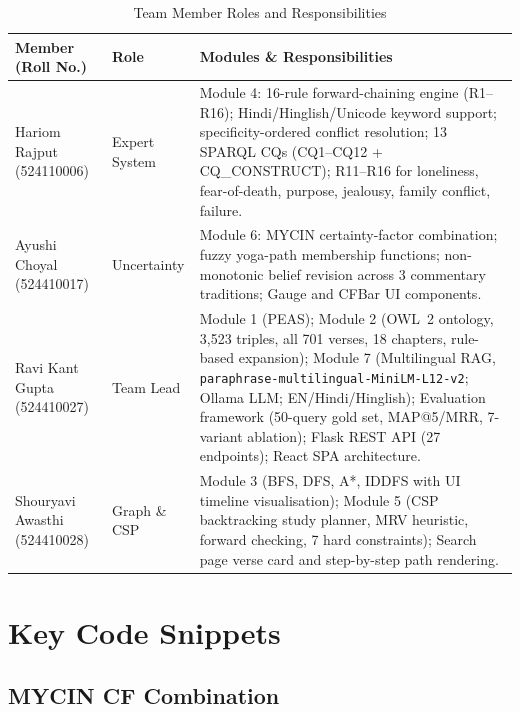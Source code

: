 \documentclass[conference]{IEEEtran}
\begin{document}
\begin{table}[!t]
\caption{Team Member Roles and Responsibilities}
\label{tab:tasks}
\centering
\begin{tabular}{p{3.0cm}p{2.0cm}p{10.5cm}}
\toprule
\textbf{Member (Roll No.)} & \textbf{Role} & \textbf{Modules \& Responsibilities} \\
\midrule
Hariom Rajput \newline (524110006)
  & Expert System
  & Module 4: 16-rule forward-chaining engine (R1--R16); Hindi/Hinglish/Unicode keyword support; specificity-ordered conflict resolution; 13 SPARQL CQs (CQ1--CQ12 + CQ\_CONSTRUCT); R11--R16 for loneliness, fear-of-death, purpose, jealousy, family conflict, failure. \\
\midrule
Ayushi Choyal \newline (524410017)
  & Uncertainty
  & Module 6: MYCIN certainty-factor combination; fuzzy yoga-path membership functions; non-monotonic belief revision across 3 commentary traditions; Gauge and CFBar UI components. \\
\midrule
Ravi Kant Gupta \newline (524410027)
  & Team Lead
  & Module 1 (PEAS); Module 2 (OWL~2 ontology, 3,523 triples, all 701 verses, 18 chapters, rule-based expansion); Module 7 (Multilingual RAG, \texttt{paraphrase-multilingual-MiniLM-L12-v2}; Ollama LLM; EN/Hindi/Hinglish); Evaluation framework (50-query gold set, MAP@5/MRR, 7-variant ablation); Flask REST API (27 endpoints); React SPA architecture. \\
\midrule
Shouryavi Awasthi \newline (524410028)
  & Graph \& CSP
  & Module 3 (BFS, DFS, A*, IDDFS with UI timeline visualisation); Module 5 (CSP backtracking study planner, MRV heuristic, forward checking, 7 hard constraints); Search page verse card and step-by-step path rendering. \\
\bottomrule
\end{tabular}
\end{table}

\section{Key Code Snippets}

\subsection{MYCIN CF Combination}
\end{document}
